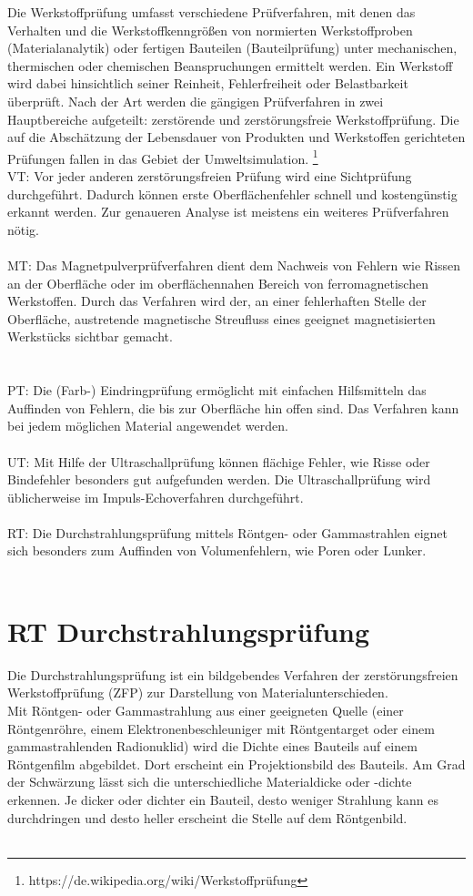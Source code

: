 \glqq Die Werkstoffprüfung umfasst verschiedene Prüfverfahren, mit denen das Verhalten und die
Werkstoffkenngrößen von normierten Werkstoffproben (Materialanalytik) oder fertigen Bauteilen
(Bauteilprüfung) unter mechanischen, thermischen oder chemischen Beanspruchungen ermittelt
werden.
Ein Werkstoff wird dabei hinsichtlich seiner Reinheit, Fehlerfreiheit oder Belastbarkeit überprüft. Nach
der Art werden die gängigen Prüfverfahren in zwei Hauptbereiche aufgeteilt: zerstörende und
zerstörungsfreie Werkstoffprüfung. Die auf die Abschätzung der Lebensdauer von Produkten und
Werkstoffen gerichteten Prüfungen fallen in das Gebiet der Umweltsimulation.\grqq
\footnote[1]{https://de.wikipedia.org/wiki/Werkstoffprüfung}
\\
VT: Vor jeder anderen zerstörungsfreien Prüfung wird eine Sichtprüfung durchgeführt. Dadurch
können erste Oberflächenfehler schnell und kostengünstig erkannt werden. Zur genaueren Analyse
ist meistens ein weiteres Prüfverfahren nötig.\\
\\
MT: Das Magnetpulverprüfverfahren dient dem Nachweis von Fehlern wie Rissen an der Oberfläche
oder im oberflächennahen Bereich von ferromagnetischen Werkstoffen. Durch das Verfahren wird
der, an einer fehlerhaften Stelle der Oberfläche, austretende magnetische Streufluss eines geeignet
magnetisierten Werkstücks sichtbar gemacht.\\
\\
\\
PT: Die (Farb-) Eindringprüfung ermöglicht mit einfachen Hilfsmitteln das Auffinden von Fehlern, die
bis zur Oberfläche hin offen sind. Das Verfahren kann bei jedem möglichen Material angewendet
werden.\\
\\
UT: Mit Hilfe der Ultraschallprüfung können flächige Fehler, wie Risse oder Bindefehler besonders
gut aufgefunden werden. Die Ultraschallprüfung wird üblicherweise im Impuls-Echoverfahren
durchgeführt.\\
\\
RT: Die Durchstrahlungsprüfung mittels Röntgen- oder Gammastrahlen eignet sich besonders zum
Auffinden von Volumenfehlern, wie Poren oder Lunker.\\
\\
\section{RT Durchstrahlungsprüfung}
\label{subsec:ndt}
Die Durchstrahlungsprüfung ist ein bildgebendes Verfahren der zerstörungsfreien Werkstoffprüfung (ZFP) zur Darstellung von Materialunterschieden.\\
Mit Röntgen- oder Gammastrahlung aus einer geeigneten Quelle (einer Röntgenröhre, einem Elektronenbeschleuniger mit Röntgentarget oder einem gammastrahlenden Radionuklid) wird die Dichte eines Bauteils auf einem Röntgenfilm abgebildet. Dort erscheint ein Projektionsbild des Bauteils. Am Grad der Schwärzung lässt sich die unterschiedliche Materialdicke oder -dichte erkennen. Je dicker oder dichter ein Bauteil, desto weniger Strahlung kann es durchdringen und desto heller erscheint die Stelle auf dem Röntgenbild.\\
\\
